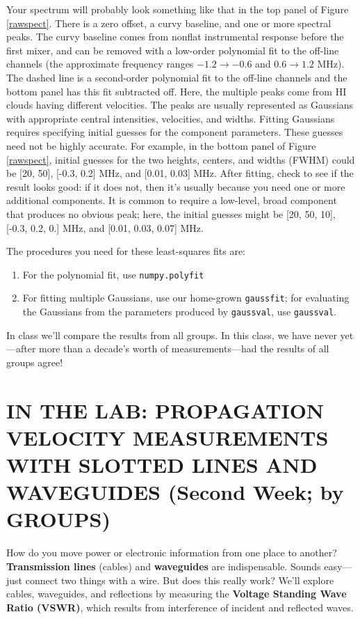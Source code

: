 \documentclass[12pt,preprint]{aastex}
\begin{document}
Your spectrum will probably look something like that in the top panel of
Figure \ref{rawspect}. There is a zero offset, a curvy baseline, and
one or more spectral peaks. The curvy baseline comes from nonflat
instrumental response before the first mixer, and can be removed with a
low-order polynomial fit to the off-line channels (the approximate
frequency ranges $-1.2 \rightarrow -0.6$ and $ 0.6 \rightarrow 1.2$
MHz). The dashed line is a second-order polynomial fit to the off-line
channels and the bottom panel has this fit subtracted off.  Here, the
multiple peaks come from HI clouds having different velocities. The
peaks are usually represented as Gaussians with appropriate central
intensities, velocities, and widths.  Fitting Gaussians requires
specifying initial guesses for the component parameters. These guesses
need not be highly accurate. For example, in the bottom panel of Figure
\ref{rawspect}, initial guesses for the two heights, centers, and widths
(FWHM) could be [20, 50], [-0.3, 0.2] MHz, and [0.01, 0.03] MHz.  After
fitting, check to see if the result looks good: if it does not, then
it's usually because you need one or more additional components. It is
common to require a low-level, broad component that produces no obvious
peak; here, the initial guesses might be [20, 50, 10], [-0.3, 0.2, 0.]
MHz, and [0.01, 0.03, 0.07] MHz. 

The procedures you need for these least-squares fits
are: \begin{enumerate}
\item For the polynomial fit, use {\tt numpy.polyfit}

\item For fitting multiple Gaussians, use our home-grown {\tt gaussfit}; for
  evaluating the Gaussians from the parameters produced by {\tt gaussval}, 
  use {\tt gaussval}.
\end{enumerate}

In class we'll compare the results from all groups. In this class, we
have never yet---after more than a decade's worth of measurements---had
the results of all groups agree!

\section {IN THE LAB: PROPAGATION VELOCITY MEASUREMENTS WITH SLOTTED LINES AND 
WAVEGUIDES (Second Week; by GROUPS)} \label{expt}

How do you move power or electronic information from one place to
another? {\bf Transmission lines} (cables) and {\bf waveguides} are
indispensable. Sounds easy---just connect two things with a wire. But
does this really work? We'll explore cables, waveguides, and reflections
by measuring the {\bf Voltage Standing Wave Ratio (VSWR)}, which results from
interference of incident and reflected waves.
\end{document}
